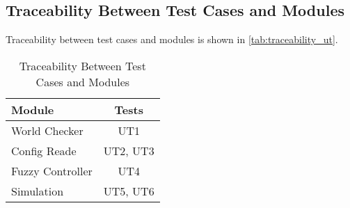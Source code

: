 \documentclass[12pt, titlepage]{article}
\begin{document}




















\subsection{Traceability Between Test Cases and Modules}

Traceability between test cases and modules is shown in
\autoref{tab:traceability_ut}.

\begin{table}[h]
  \centering
  \caption{Traceability Between Test Cases and Modules}
  \vspace{3mm}
  \label{tab:traceability_ut}
  \begin{tabular}{l|c}
    Module           & Tests    \\ \hline
    World Checker    & UT1      \\
    Config Reade     & UT2, UT3 \\
    Fuzzy Controller & UT4      \\
    Simulation       & UT5, UT6 \\
  \end{tabular}
\end{table}
\end{document}
